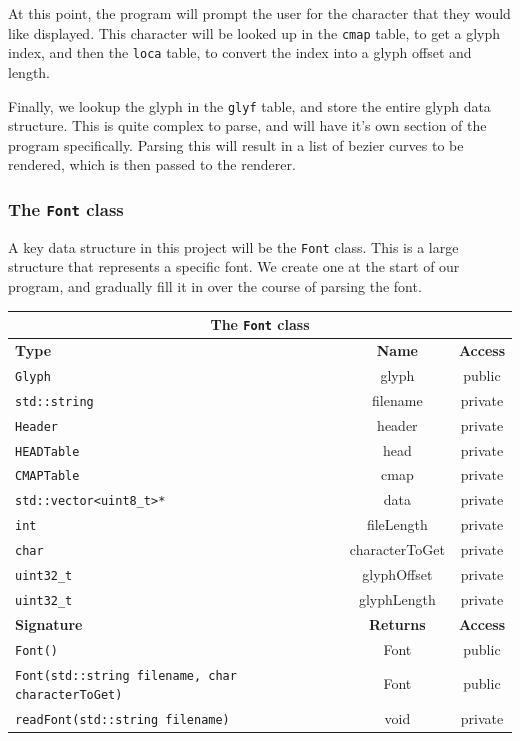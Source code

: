 \documentclass{report}
\begin{document}
At this point, the program will prompt the user for the character that they
would like displayed. This character will be looked up in the \texttt{cmap}
table, to get a glyph index, and then the \texttt{loca} table, to convert the
index into a glyph offset and length.

Finally, we lookup the glyph in the \texttt{glyf} table, and store the entire
glyph data structure. This is quite complex to parse, and will have it's own
section of the program specifically. Parsing this will result in a list of
bezier curves to be rendered, which is then passed to the renderer. 

\subsubsection{The \texttt{Font} class}
A key data structure in this project will be the \texttt{Font} class. This is a
large structure that represents a specific font. We create one at the start of
our program, and gradually fill it in over the course of parsing the font. 

\begin{center}
  \begin{tabular}{|p{7.5cm}|c|c|}
    \hline
    \multicolumn{3}{|c|}{The \texttt{Font} class} \\
    \hline
    \textbf{Type} & \textbf{Name} & \textbf{Access} \\
    \hline
    \texttt{Glyph} & glyph & public \\
    \hline
    \texttt{std::string} & filename & private \\
    \hline
    \texttt{Header} & header & private \\
    \hline
    \texttt{HEADTable} & head & private \\
    \hline
    \texttt{CMAPTable} & cmap & private \\
    \hline
    \texttt{std::vector<uint8\_t>*} & data & private \\
    \hline
    \texttt{int} & fileLength & private \\
    \hline
    \texttt{char} & characterToGet & private \\
    \hline
    \texttt{uint32\_t} & glyphOffset & private \\
    \hline
    \texttt{uint32\_t} & glyphLength & private \\
    \hline
    \hline
    \textbf{Signature} & \textbf{Returns} & \textbf{Access} \\
    \hline
    \texttt{Font()} & Font & public \\
    \hline
    \texttt{Font(std::string filename, char characterToGet)} & Font & public \\
    \hline
    \texttt{readFont(std::string filename)} & void & private \\
    \hline
  \end{tabular}
\end{center}
\end{document}
